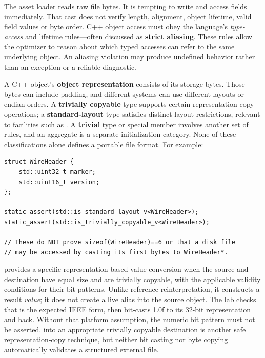\hypertarget{01-foundations-i-ch004-a-file-is-a-sequence-of-bytes-not-an-object-of-the-type-we-wish-were-there}{}

The asset loader reads raw file bytes. It is tempting to write  and access fields immediately. That cast does not verify length, alignment, object lifetime, valid field values or byte order. C++ object access must obey the language's \emph{type-access} and lifetime rules---often discussed as \textbf{strict aliasing}. These rules allow the optimizer to reason about which typed accesses can refer to the same underlying object. An aliasing violation may produce undefined behavior rather than an exception or a reliable diagnostic.

A C++ object's \textbf{object representation} consists of its storage bytes. Those bytes can include padding, and different systems can use different layouts or endian orders. A \textbf{trivially copyable} type supports certain representation-copy operations; a \textbf{standard-layout} type satisfies distinct layout restrictions, relevant to facilities such as . A \textbf{trivial} type or special member involves another set of rules, and an aggregate is a separate initialization category. None of these classifications alone defines a portable file format. For example:

\begin{verbatim}
struct WireHeader {
    std::uint32_t marker;
    std::uint16_t version;
};

static_assert(std::is_standard_layout_v<WireHeader>);
static_assert(std::is_trivially_copyable_v<WireHeader>);

// These do NOT prove sizeof(WireHeader)==6 or that a disk file
// may be accessed by casting its first bytes to WireHeader*.
\end{verbatim}

 provides a specific representation-based value conversion when the source and destination have equal size and are trivially copyable, with the applicable validity conditions for their bit patterns. Unlike reference reinterpretation, it constructs a result \emph{value}; it does not create a live alias into the source object. The lab checks that  is the expected IEEE form, then bit-casts 1.0f to its 32-bit representation  and back. Without that platform assumption, the numeric bit pattern must not be asserted.  into an appropriate trivially copyable destination is another safe representation-copy technique, but neither bit casting nor byte copying automatically validates a structured external file.

